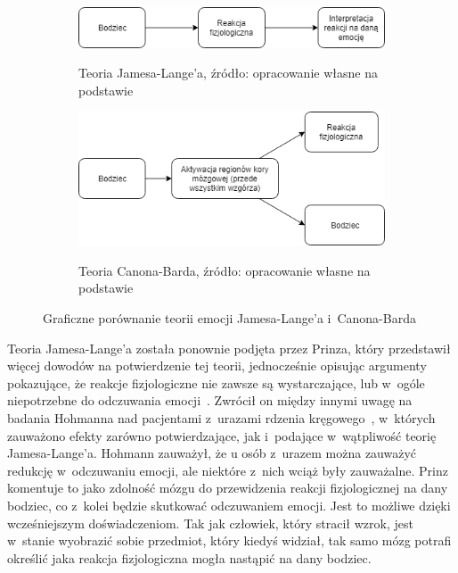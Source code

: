 \begin{figure}[h]
	\centering
	\begin{subfigure}{0.7\textwidth}
		\includegraphics[width=\linewidth]{images/james-lang.png}
		\label{fig:james}
		\caption{Teoria Jamesa-Lange'a, źródło: opracowanie własne na podstawie~\cite{Coleman2011}}
	\end{subfigure}
	\begin{subfigure}{0.7\textwidth}
		\includegraphics[width=\linewidth]{images/cannon-bard.png}
		\label{fig:canon}
		\caption{Teoria Canona-Barda, źródło: opracowanie własne na podstawie~\cite{cannon_1927}}
	\end{subfigure}
	\caption{Graficzne porównanie teorii emocji Jamesa-Lange'a i~Canona-Barda}
\end{figure}

Teoria Jamesa-Lange'a została ponownie podjęta przez Prinza, który przedstawił więcej dowodów na potwierdzenie tej teorii, jednocześnie opisując argumenty pokazujące, że reakcje fizjologiczne nie zawsze są wystarczające, lub w~ogóle niepotrzebne do odczuwania emocji~\cite{Prinz2004-PRIEE-2}. Zwrócił on między innymi uwagę na badania Hohmanna nad pacjentami z~urazami rdzenia kręgowego~\cite{Hohmann1966SomeEO}, w~których zauważono efekty zarówno potwierdzające, jak i~podające w~wątpliwość teorię Jamesa-Lange'a. Hohmann zauważył, że u osób z~urazem można zauważyć redukcję w~odczuwaniu emocji, ale niektóre z~nich wciąż były zauważalne. Prinz komentuje to jako zdolność mózgu do przewidzenia reakcji fizjologicznej na dany bodziec, co z~kolei będzie skutkować odczuwaniem emocji. Jest to możliwe dzięki wcześniejszym doświadczeniom. Tak jak człowiek, który stracił wzrok, jest w~stanie wyobrazić sobie przedmiot, który kiedyś widział, tak samo mózg potrafi określić jaka reakcja fizjologiczna mogła nastąpić na dany bodziec.

